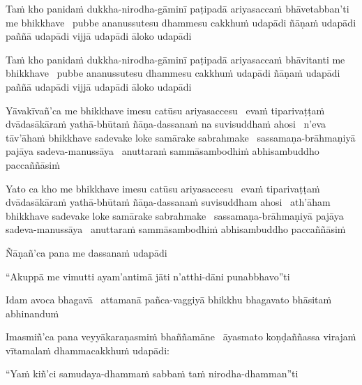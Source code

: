\begin{pali-hang}
  Taṁ kho panidaṁ dukkha-nirodha-gāminī paṭipadā ariyasaccaṁ bhāvetabban'ti me bhikkhave \breathmark\ pubbe ananussutesu dhammesu cakkhuṁ udapādi ñāṇaṁ udapādi paññā udapādi vijjā udapādi āloko udapādi
\end{pali-hang}

\begin{pali-hang}
  Taṁ kho panidaṁ dukkha-nirodha-gāminī paṭipadā ariyasaccaṁ bhāvitanti me bhikkhave \breathmark\ pubbe ananussutesu dhammesu cakkhuṁ udapādi ñāṇaṁ udapādi paññā udapādi vijjā udapādi āloko udapādi
\end{pali-hang}

\begin{pali-hang}
  Yāvakīvañ'ca me bhikkhave imesu catūsu ariyasaccesu \breathmark\ evaṁ tiparivaṭṭaṁ dvādasākāraṁ yathā-bhūtaṁ ñāṇa-dassanaṁ na suvisuddhaṁ ahosi \breathmark\ n'eva tāv'āhaṁ bhikkhave sadevake loke samārake sabrahmake \breathmark\ sassamaṇa-brāhmaṇiyā pajāya sadeva-manussāya \breathmark\ anuttaraṁ sammāsambodhiṁ abhisambuddho paccaññāsiṁ
\end{pali-hang}

\begin{pali-hang}
  Yato ca kho me bhikkhave imesu catūsu ariyasaccesu \breathmark\ evaṁ tiparivaṭṭaṁ dvādasākāraṁ yathā-bhūtaṁ ñāṇa-dassanaṁ suvisuddham ahosi \breathmark\ ath'āham bhikkhave sadevake loke samārake sabrahmake \breathmark\ sassamaṇa-brāhmaṇiyā pajāya sadeva-manussāya \breathmark\ anuttaraṁ sammāsambodhiṁ abhisambuddho paccaññāsiṁ
\end{pali-hang}

Ñāṇañ'ca pana me dassanaṁ udapādi

\begin{pali-hang}
  ``Akuppā me vimutti ayam'antimā jāti n'atthi-dāni punabbhavo''ti
\end{pali-hang}

\begin{pali-hang}
  Idam avoca bhagavā \breathmark\ attamanā pañca-vaggiyā bhikkhu bhagavato bhāsitaṁ abhinanduṁ
\end{pali-hang}

\begin{pali-hang}
  Imasmiñ'ca pana veyyākaraṇasmiṁ bhaññamāne \breathmark\ āyasmato koṇḍaññassa virajaṁ vītamalaṁ dhammacakkhuṁ udapādi:
\end{pali-hang}

``Yaṁ kiñ'ci samudaya-dhammaṁ sabbaṁ taṁ nirodha-dhamman''ti

